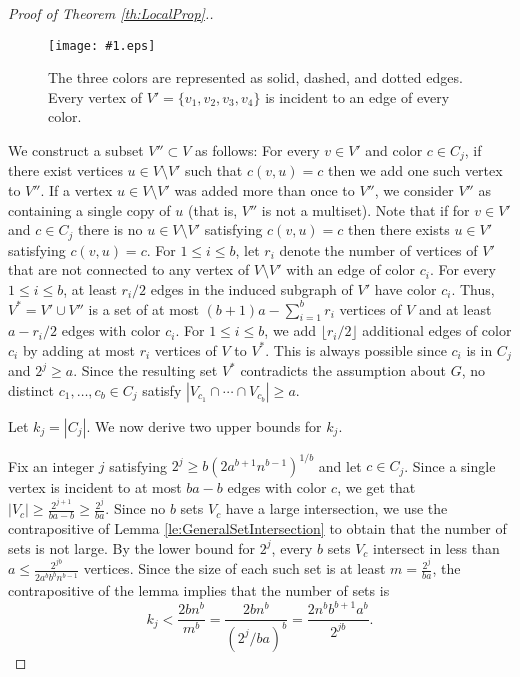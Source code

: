 \documentclass[11pt]{article}
\newcommand{\parag}[1]{\vspace{2mm}

\noindent{\bf #1} }
\newcommand{\placefig}[2]
        {\texttt{[image: \#1.eps]}}
\begin{document}
\begin{proof}[Proof of Theorem \ref{th:LocalProp}.]
\begin{figure}[h]
\centerline{\placefig{ForbiddenConf2}{0.6\textwidth}}
\vspace{-1mm}

\caption{\small \sf The three colors are represented as solid, dashed, and dotted edges. Every vertex of $V' = \{v_1,v_2,v_3,v_4\}$ is incident to an edge of every color. }
\label{fi:ForbiddenConf2}
\vspace{-2mm}
\end{figure}

We construct a subset $V'' \subset V$ as follows: For every $v\in V'$ and color $c \in C_j$, if there exist vertices $u \in V\setminus V'$ such that $c(v,u)=c$ then we add one such vertex to $V''$.
If a vertex $u \in V\setminus V'$ was added more than once to $V''$, we consider $V''$ as containing a single copy of $u$ (that is, $V''$ is not a multiset).
Note that if for $v\in V'$ and $c\in C_j$ there is no $u \in V\setminus V'$ satisfying $c(v,u)=c$ then there exists $u\in V'$ satisfying $c(v,u)=c$.
For $1 \le i \le b$, let $r_i$ denote the number of vertices of $V'$ that are not connected to any vertex of $V\setminus V'$ with an edge of color $c_i$.
For every $1 \le i \le b$, at least $r_i/2$ edges in the induced subgraph of $V'$ have color $c_i$.
Thus, $V^* = V' \cup V''$ is a set of at most $(b+1)a-\sum_{i=1}^b r_i$ vertices of $V$ and at least $a-r_i/2$ edges with color $c_i$.
For $1 \le i \le b$, we add $\lfloor r_i/2 \rfloor$ additional edges of color $c_i$ by adding at most $r_i$ vertices of $V$ to $V^*$.
This is always possible since $c_i$ is in $C_j$ and $2^j\ge a$.
Since the resulting set $V^*$ contradicts the assumption about $G$, no distinct $c_1, \ldots, c_b \in C_j$ satisfy $|V_{c_1} \cap \cdots \cap V_{c_b}| \ge a$.

\parag{Popular colors.}
Let $k_j = |C_j|$.
We now derive two upper bounds for $k_j$.

Fix an integer $j$ satisfying $2^j\ge b(2a^{b+1}n^{b-1})^{1/b}$ and let $c \in C_j$.
Since a single vertex is incident to at most $ba-b$ edges with color $c$, we get that $|V_c|\ge \frac{2^{j+1}}{ba-b} \ge \frac{2^j}{ba}$.
Since no $b$ sets $V_c$ have a large intersection, we use the contrapositive of Lemma \ref{le:GeneralSetIntersection} to obtain that the number of sets is not large.
By the lower bound for $2^j$, every $b$ sets $V_c$ intersect in less than $a \le \frac{2^{jb}}{2a^b b^b n^{b-1}}$ vertices.
Since the size of each such set is at least $m=\frac{2^j}{ba}$, the contrapositive of the lemma implies that the number of sets is
%
\begin{equation} \label{eq:RichDistUpper}
k_j < \frac{2bn^b}{m^b}= \frac{2bn^b}{(2^j/ba)^b} = \frac{2n^b b^{b+1}a^b}{2^{jb}}.
\end{equation}


\end{proof}
\end{document}
